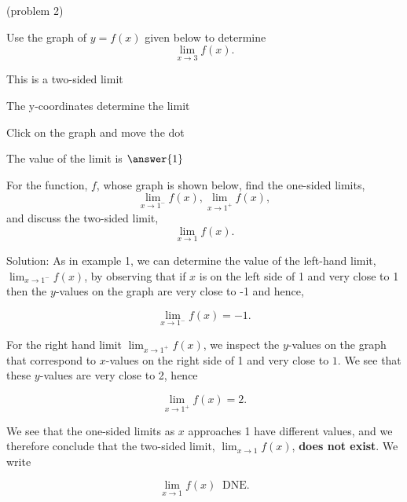 \documentclass[handout]{ximera}
\begin{document}
\begin{problem}(problem 2)




Use the graph of $y = f(x)$ given below to determine
  \[
  \lim_{x\to 3} f(x).
  \]
  
    \begin{hint}
      This is a two-sided limit
    \end{hint}
    \begin{hint}
      The y-coordinates determine the limit
    \end{hint}
		\begin{hint}
		  Click on the graph and move the dot
		\end{hint}
		The value of the limit is
		 $\answer{1}$

	
\end{problem}

\begin{example}[example 3]
For the function, $f$, whose graph is shown below, find the one-sided limits,
\[\lim_{x \to 1^-}f(x), \lim_{x \to 1^+}f(x),
\] 
and discuss the two-sided limit, 
\[\lim_{x \to 1} f(x).
\]





\vspace{.25in}
Solution: As in example 1, we can determine the value of the left-hand limit, $\lim_{x \to 1^-}f(x)$, 
by observing that if $x$ is on the left side of 1 and very close to 1 then the $y$-values on the 
graph are very close to -1 and hence, 

\[
\lim_{x \to 1^-}f(x) = -1.
\]

For the right hand limit $\lim_{x \to 1^+}f(x)$, we inspect the $y$-values on the 
graph that correspond to $x$-values on the right side of 1 and very close to $1$.  
We see that these $y$-values are very close to 2, hence

\[
\lim_{x \to 1^+}f(x) = 2.
\]

We see that the one-sided limits as $x$ approaches 1 have different values, and we therefore 
conclude that the two-sided limit, $\lim_{x \to 1}f(x)$, \textbf{does not exist}.  We write

\[
\lim_{x \to 1}f(x) \;\;\text{DNE}.
\]

\end{example}
\end{document}
